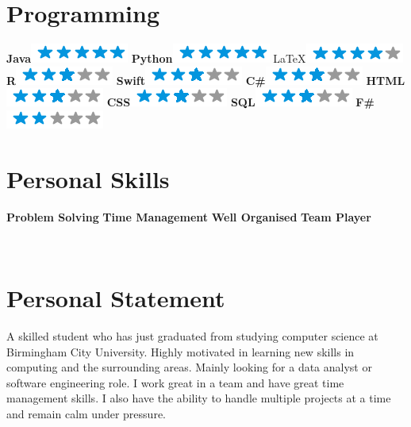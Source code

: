 \documentclass[]{friggeri-cv}
\begin{document}
\begin{aside}
  \section{Programming}
    \textbf{Java}\includegraphics[scale=0.40]{img/5stars.png}
    \textbf{Python}\includegraphics[scale=0.40]{img/5stars.png}
    \LaTeX \includegraphics[scale=0.40]{img/4stars.png}
    \textbf{R}\includegraphics[scale=0.40]{img/3stars.png}
    \textbf{Swift}\includegraphics[scale=0.40]{img/3stars.png}
    \textbf{C\#}\includegraphics[scale=0.40]{img/3stars.png}
    \textbf{HTML}\includegraphics[scale=0.40]{img/3stars.png}
    \textbf{CSS}\includegraphics[scale=0.40]{img/3stars.png}
    \textbf{SQL}\includegraphics[scale=0.40]{img/3stars.png}    
    \textbf{F\#}\includegraphics[scale=0.40]{img/2stars.png}
    ~
  \section{Personal Skills}
    \textbf{Problem Solving}
    \textbf{Time Management}
    \textbf{Well Organised}
    \textbf{Team Player}    
    ~
\end{aside}
~
\section{Personal Statement}
A skilled student who has just graduated from studying computer science at Birmingham City
University. Highly motivated in learning new skills in computing and the surrounding areas. Mainly
looking for a data analyst or software engineering role. I work great in a team and have great time
management skills. I also have the ability to handle multiple projects at a time and remain calm under pressure.
\end{document}
